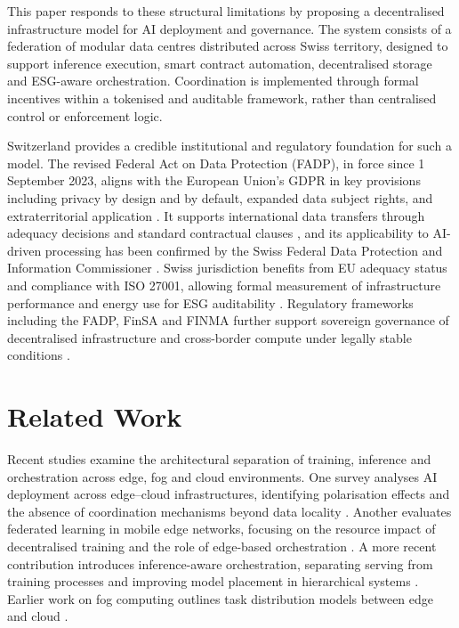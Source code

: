 \documentclass[oneside,10pt]{swissi}
\begin{document}
This paper responds to these structural limitations by proposing a decentralised infrastructure model for AI deployment and governance. The system consists of a federation of modular data centres distributed across Swiss territory, designed to support inference execution, smart contract automation, decentralised storage and ESG-aware orchestration. Coordination is implemented through formal incentives within a tokenised and auditable framework, rather than centralised control or enforcement logic.

Switzerland provides a credible institutional and regulatory foundation for such a model. The revised Federal Act on Data Protection (FADP), in force since 1 September 2023, aligns with the European Union’s GDPR in key provisions including privacy by design and by default, expanded data subject rights, and extraterritorial application \cite{fadp2023,gdpralign2023,extraterritorial2023}. It supports international data transfers through adequacy decisions and standard contractual clauses \cite{privacyprinciples}, and its applicability to AI-driven processing has been confirmed by the Swiss Federal Data Protection and Information Commissioner \cite{fdpic2025,aiapplicability2025}. Swiss jurisdiction benefits from EU adequacy status and compliance with ISO 27001, allowing formal measurement of infrastructure performance and energy use for ESG auditability \cite{securitycertification2025}. Regulatory frameworks including the FADP, FinSA and FINMA further support sovereign governance of decentralised infrastructure and cross-border compute under legally stable conditions \cite{finmasaneutrality2024,dataregfin2025}.

\section{Related Work}

Recent studies examine the architectural separation of training, inference and orchestration across edge, fog and cloud environments. One survey analyses AI deployment across edge–cloud infrastructures, identifying polarisation effects and the absence of coordination mechanisms beyond data locality \cite{Yao2021}. Another evaluates federated learning in mobile edge networks, focusing on the resource impact of decentralised training and the role of edge-based orchestration \cite{Lim2019}. A more recent contribution introduces inference-aware orchestration, separating serving from training processes and improving model placement in hierarchical systems \cite{Lackinger2024}. Earlier work on fog computing outlines task distribution models between edge and cloud \cite{Mouradian2017}.
\end{document}
